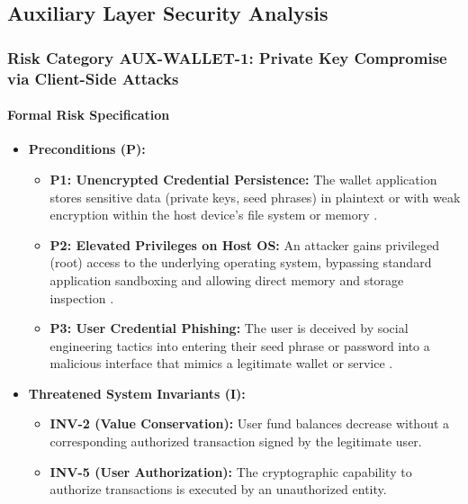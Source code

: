\subsection{Auxiliary Layer Security Analysis}
\label{sec:results_auxiliary}

\subsubsection{Risk Category AUX-WALLET-1: Private Key Compromise via Client-Side Attacks}

\paragraph{Formal Risk Specification}

\begin{itemize}
    \item \textbf{Preconditions (P):}
    \begin{itemize}
        \item \textbf{P1: Unencrypted Credential Persistence:} The wallet application stores sensitive data (private keys, seed phrases) in plaintext or with weak encryption within the host device's file system or memory \cite{houy2023}.
        \item \textbf{P2: Elevated Privileges on Host OS:} An attacker gains privileged (root) access to the underlying operating system, bypassing standard application sandboxing and allowing direct memory and storage inspection \cite{houy2023}.
        \item \textbf{P3: User Credential Phishing:} The user is deceived by social engineering tactics into entering their seed phrase or password into a malicious interface that mimics a legitimate wallet or service \cite{yu2024}.
    \end{itemize}

    \item \textbf{Threatened System Invariants (I):}
    \begin{itemize}
        \item \textbf{INV-2 (Value Conservation):} User fund balances decrease without a corresponding authorized transaction signed by the legitimate user.
        \item \textbf{INV-5 (User Authorization):} The cryptographic capability to authorize transactions is executed by an unauthorized entity.
    \end{itemize}


\end{itemize}
